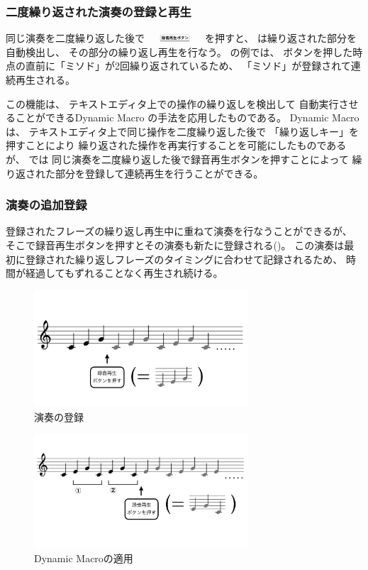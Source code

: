 \subsubsection{二度繰り返された演奏の登録と再生}

同じ演奏を二度繰り返した後で
\includegraphics[height=3mm,width=20mm,bb=3 23 360 80]{images/recbutton.png}
を押すと、
{\system}は繰り返された部分を自動検出し、
その部分の繰り返し再生を行なう。
の例では、
ボタンを押した時点の直前に「ミソド」が2回繰り返されているため、
「ミソド」が登録されて連続再生される。

この機能は、
テキストエディタ上での操作の繰り返しを検出して
自動実行させることができるDynamic Macro\cite{masui}
の手法を応用したものである。
Dynamic Macroは、
テキストエディタ上で同じ操作を二度繰り返した後で
「繰り返しキー」を押すことにより
繰り返された操作を再実行することを可能にしたものであるが、
{\system}では
同じ演奏を二度繰り返した後で録音再生ボタンを押すことによって
繰り返された部分を登録して連続再生を行うことができる。

\subsubsection{演奏の追加登録}

登録されたフレーズの繰り返し再生中に重ねて演奏を行なうことができるが、
そこで録音再生ボタンを押すとその演奏も新たに登録される()。
この演奏は最初に登録された繰り返しフレーズのタイミングに合わせて記録されるため、
時間が経過してもずれることなく再生され続ける。

\begin{figure}[tb]
\includegraphics[width=8cm,bb=0 0 926 504]{images/rp1.png}
\centering
\caption{演奏の登録}
\label{recplay1}
\end{figure}

\begin{figure}[tb]
\includegraphics[width=8cm,bb=0 0 1054 481]{images/rp2.png}
\centering
\caption{Dynamic Macroの適用}
\label{recplay2}
\end{figure}

